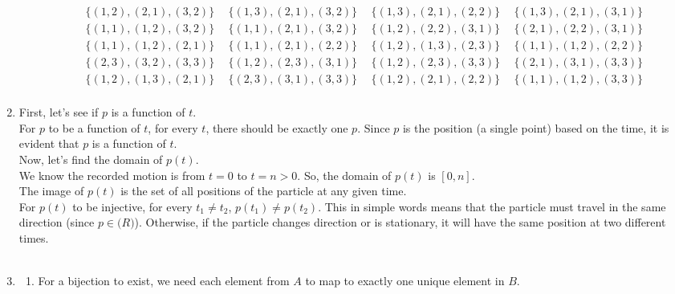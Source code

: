\documentclass[a4paper]{article}
\begin{document}
\begin{enumerate}
\begin{enumerate}
\begin{align*}
            \{(1, 2), (2, 1), (3, 2)\}\ & \ \{(1, 3), (2, 1), (3, 2)\}\ & \ \{(1, 3), (2, 1), (2, 2)\}\ & \ \{(1, 3), (2, 1), (3, 1)\}\\
            \{(1, 1), (1, 2), (3, 2)\}\ & \ \{(1, 1), (2, 1), (3, 2)\}\ & \ \{(1, 2), (2, 2), (3, 1)\}\ & \ \{(2, 1), (2, 2), (3, 1)\}\\
            \{(1, 1), (1, 2), (2, 1)\}\ & \ \{(1, 1), (2, 1), (2, 2)\}\ & \ \{(1, 2), (1, 3), (2, 3)\}\ & \ \{(1, 1), (1, 2), (2, 2)\}\\
            \{(2, 3), (3, 2), (3, 3)\}\ & \ \{(1, 2), (2, 3), (3, 1)\}\ & \ \{(1, 2), (2, 3), (3, 3)\}\ & \ \{(2, 1), (3, 1), (3, 3)\}\\
            \{(1, 2), (1, 3), (2, 1)\}\ & \ \{(2, 3), (3, 1), (3, 3)\}\ & \ \{(1, 2), (2, 1), (2, 2)\}\ & \ \{(1, 1), (1, 2), (3, 3)\}\\
        \end{align*}
    \end{enumerate}

    \newpage
    \item First, let's see if $p$ is a function of $t$.\\
    For $p$ to be a function of $t$, for every $t$, there should be exactly one $p$. Since $p$ is the position (a single point) based on the time, it is evident that $p$ is a function of $t$.\\

    Now, let's find the domain of $p(t)$.\\
    We know the recorded motion is from $t = 0$ to $t = n > 0$. So, the domain of $p(t)$ is $[0, n]$.\\

    The image of $p(t)$ is the set of all positions of the particle at any given time.\\

    For $p(t)$ to be injective, for every $t_1 \neq t_2$, $p(t_1) \neq p(t_2)$. This in simple words means that the particle must travel in the same direction (since $p \in \mathbb(R)$). Otherwise, if the particle changes direction or is stationary, it will have the same position at two different times.\\ \\

    \item \begin{enumerate}
        \item For a bijection to exist, we need each element from $A$ to map to exactly one unique element in $B$.\\


\end{enumerate}
\end{enumerate}
\end{document}
